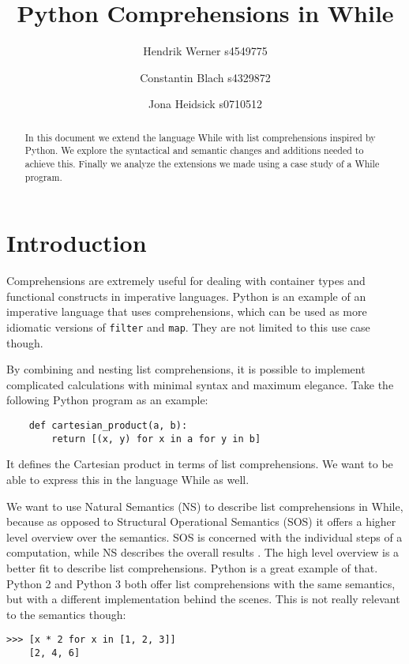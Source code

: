\documentclass[12pt]{article}
\title{
    Python Comprehensions in While
}
\author{
    Hendrik Werner s4549775
    \and Constantin Blach s4329872
    \and Jona Heidsick s0710512
}
\newcommand\mono\texttt
\begin{document}
\maketitle

\begin{abstract}
\noindent %
In this document we extend the language While with list comprehensions inspired by Python. We explore the syntactical and semantic changes and additions needed to achieve this. Finally we analyze the extensions we made using a case study of a While program.
\end{abstract}

\tableofcontents

\section{Introduction}
Comprehensions are extremely useful for dealing with container types and functional constructs in imperative languages. Python is an example of an imperative language that uses comprehensions, which can be used as more idiomatic versions of \mono{filter} and \mono{map}. They are not limited to this use case though.

By combining and nesting list comprehensions, it is possible to implement complicated calculations with minimal syntax and maximum elegance. Take the following Python program as an example:

\begin{lstlisting}
    def cartesian_product(a, b):
        return [(x, y) for x in a for y in b]
\end{lstlisting}

It defines the Cartesian product in terms of list comprehensions. We want to be able to express this in the language While as well.

We want to use Natural Semantics (NS) to describe list comprehensions in While, because as opposed to Structural Operational Semantics (SOS) it offers a higher level overview over the semantics. SOS is concerned with the individual steps of a computation, while NS describes the overall results \cite{wiley}. The high level overview is a better fit to describe list comprehensions. Python is a great example of that. Python 2 and Python 3 both offer list comprehensions with the same semantics, but with a different implementation behind the scenes. This is not really relevant to the semantics though:

\begin{lstlisting}[title=Python 2/3]
    >>> [x * 2 for x in [1, 2, 3]]
    [2, 4, 6]
\end{lstlisting}
\end{document}
